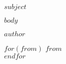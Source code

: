 \documentclass[$fontsize$, a4paper]{article}
\begin{document}
\begin{center}
{\Large\bfseries $subject$}
\end{center}

\vspace{1em}

$body$

\vspace{2em}

\begin{FlushRight}
$author$

$for(from)$
$from$\\
$endfor$
\end{FlushRight}
\end{document}
